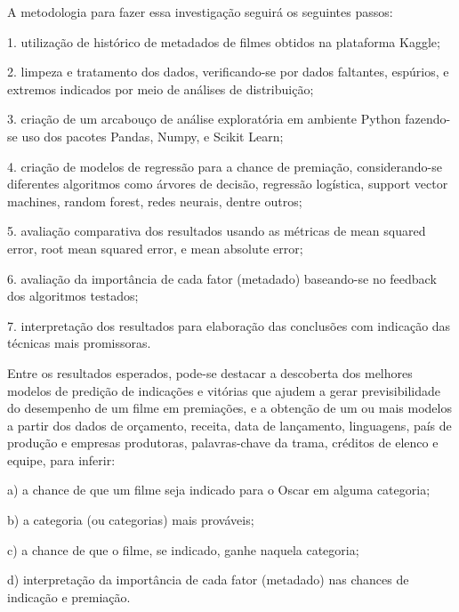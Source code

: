 A metodologia para fazer essa investigação seguirá os seguintes passos:\par

1. utilização de histórico de metadados de filmes obtidos na plataforma Kaggle;\par
2. limpeza e tratamento dos dados, verificando-se por dados faltantes, espúrios, e extremos indicados por meio de análises de distribuição;\par
3. criação de um arcabouço de análise exploratória em ambiente Python fazendo-se uso dos pacotes Pandas, Numpy, e Scikit Learn;\par
4. criação de modelos de regressão para a chance de premiação, considerando-se diferentes algoritmos como árvores de decisão, regressão logística, support vector machines, random forest, redes neurais, dentre outros;\par
5. avaliação comparativa dos resultados usando as métricas de mean squared error, root mean squared error, e mean absolute error;\par
6. avaliação da importância de cada fator (metadado) baseando-se no feedback dos algoritmos testados;\par
7. interpretação dos resultados para elaboração das conclusões com indicação das técnicas mais promissoras.\par
\par

Entre os resultados esperados, pode-se destacar a descoberta dos melhores modelos de predição de indicações e vitórias que ajudem a gerar previsibilidade do desempenho de um filme em premiações, e a obtenção de um ou mais modelos a partir dos dados de orçamento, receita, data de lançamento, linguagens, país de produção e empresas produtoras, palavras-chave da trama, créditos de elenco e equipe, para inferir:\par

a) a chance de que um filme seja indicado para o Oscar em alguma categoria;\par
b) a categoria (ou categorias) mais prováveis;\par
c) a chance de que o filme, se indicado, ganhe naquela categoria;\par
d) interpretação da importância de cada fator (metadado) nas chances de indicação e premiação.\par
